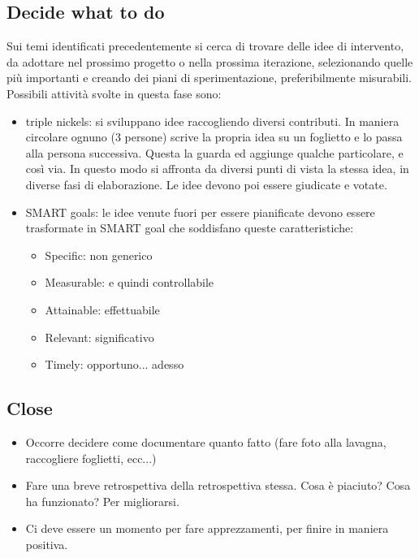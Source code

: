 \subsection{Decide what to do}

Sui temi identificati precedentemente si cerca di trovare delle idee di intervento, da adottare nel prossimo progetto o nella prossima iterazione, selezionando quelle più importanti e creando dei piani di sperimentazione, preferibilmente misurabili.\\

\noindent Possibili attività svolte in questa fase sono: 

\begin{itemize}
    \item triple nickels: si sviluppano idee raccogliendo diversi contributi. In maniera circolare ognuno (3 persone) scrive la propria idea su un foglietto e lo passa alla persona successiva. Questa la guarda ed aggiunge qualche particolare, e così via. In questo modo si affronta da diversi punti di vista la stessa idea, in diverse fasi di elaborazione. Le idee devono poi essere giudicate e votate.
    \item SMART goals: le idee venute fuori per essere pianificate devono essere trasformate in SMART goal che soddisfano queste caratteristiche:
    \begin{itemize}
        \item Specific: non generico
        \item Measurable: e quindi controllabile
        \item Attainable: effettuabile
        \item Relevant: significativo
        \item Timely: opportuno... adesso
    \end{itemize}
\end{itemize}

\subsection{Close}

\begin{itemize}
    \item Occorre decidere come documentare quanto fatto (fare foto alla lavagna, raccogliere foglietti, ecc...)
    \item Fare una breve retrospettiva della retrospettiva stessa. Cosa è piaciuto? Cosa ha funzionato? Per migliorarsi.
    \item Ci deve essere un momento per fare apprezzamenti, per finire in maniera positiva.
\end{itemize}

